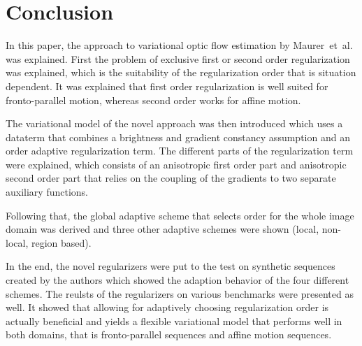 \documentclass[journal]{vgtc}
\begin{document}
\section{Conclusion}
In this paper, the approach to variational optic flow estimation by Maurer~et~al.~\cite{daspaper} was explained.
First the problem of exclusive first or second order regularization was explained, which is the suitability of the regularization order that is situation dependent.
It was explained that first order regularization is well suited for fronto-parallel motion, whereas second order works for affine motion.

The variational model of the novel approach was then introduced which uses a dataterm that combines a brightness and gradient constancy assumption and an order adaptive regularization term.
The different parts of the regularization term were explained, which consists of an anisotropic first order part and anisotropic second order part that relies on the coupling of the gradients to two separate auxiliary functions.

Following that, the global adaptive scheme that selects order for the whole image domain was derived and three other adaptive schemes were shown (local, non-local, region based).

In the end, the novel regularizers were put to the test on synthetic sequences created by the authors which showed the adaption behavior of the four different schemes.
The reulsts of the regularizers on various benchmarks were presented as well.
It showed that allowing for adaptively choosing regularization order is actually beneficial and yields a flexible variational model that performs well in both domains, that is fronto-parallel sequences and affine motion sequences. 









\end{document}
